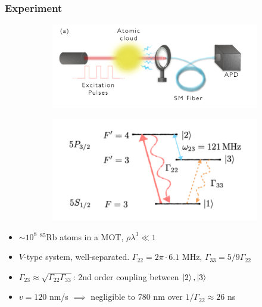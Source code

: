 \documentclass{beamer}
\theoremstyle{definition}
\begin{document}
\begin{frame}
	\frametitle{Experiment}
	
	\begin{figure}[!htb]
		\begin{subfigure}{0.55\textwidth}
			\includegraphics[width=\textwidth]{experiment.png}
		\end{subfigure}
		\begin{subfigure}{0.44\textwidth}
			\includegraphics[width=\textwidth]{Rb85_levels.png}
		\end{subfigure}
	\end{figure}

\begin{itemize}
	\item $\sim 10^8$ $^{85}$Rb atoms in a MOT, $\rho \lambda^3 \ll 1$
	\item $V$-type system, well-separated. $\Gamma_{22} = 2\pi \cdot 6.1 $ MHz, $\Gamma_{33} = 5/9 \Gamma_{22}$
	\item $\Gamma_{23} \approx \sqrt{\Gamma_{22}\Gamma_{33}}$: 2nd order coupling between $\ket{2},\ket{3}$
	\item $v = 120 $ nm/\textmu s $\implies$ negligible to 780 nm over $1/\Gamma_{22}\approx 26$ ns
\end{itemize}
\end{frame}
\end{document}

